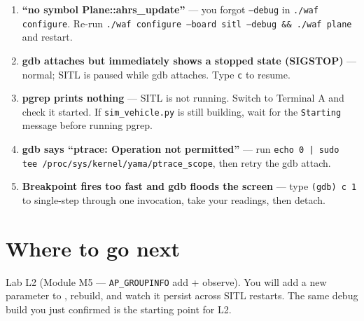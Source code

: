 \documentclass[a4paper,11pt,twoside]{article}
\begin{document}
\begin{enumerate}
  \item \textbf{``no symbol Plane::ahrs\_update''} --- you forgot \texttt{--debug} in \texttt{./waf configure}. Re-run \texttt{./waf configure --board sitl --debug \&\& ./waf plane} and restart.
  \item \textbf{gdb attaches but immediately shows a stopped state (SIGSTOP)} --- normal; SITL is paused while gdb attaches. Type \texttt{c} to resume.
  \item \textbf{pgrep prints nothing} --- SITL is not running. Switch to Terminal A and check it started. If \texttt{sim\_vehicle.py} is still building, wait for the \texttt{Starting} message before running pgrep.
  \item \textbf{gdb says ``ptrace: Operation not permitted''} --- run \texttt{echo 0 | sudo tee /proc/sys/kernel/yama/ptrace\_scope}, then retry the gdb attach.
  \item \textbf{Breakpoint fires too fast and gdb floods the screen} --- type \texttt{(gdb) c 1} to single-step through one invocation, take your readings, then detach.
\end{enumerate}

\section*{Where to go next}

Lab L2 (Module M5 --- \texttt{AP\_GROUPINFO} add + observe). You will add a new parameter to , rebuild, and watch it persist across SITL restarts. The same debug build you just confirmed is the starting point for L2.

\fi
\end{document}
